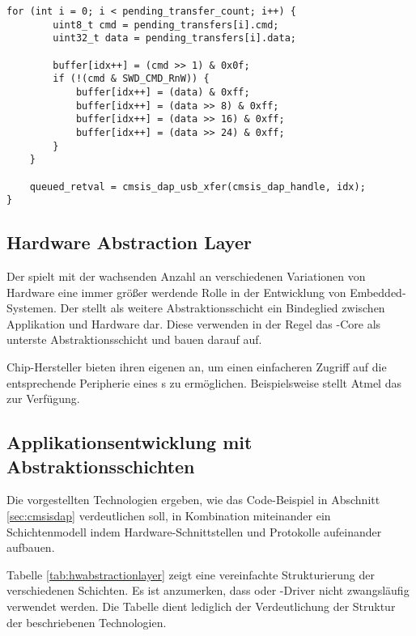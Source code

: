 \begin{enumerate}
\begin{itemize}
\begin{lstlisting}[caption={OpenOCD, \texttt{cmsis\_dap\_usb.c}}, label=cmsisqueue]
    for (int i = 0; i < pending_transfer_count; i++) {
        uint8_t cmd = pending_transfers[i].cmd;
        uint32_t data = pending_transfers[i].data;

        buffer[idx++] = (cmd >> 1) & 0x0f;
        if (!(cmd & SWD_CMD_RnW)) {
        	buffer[idx++] = (data) & 0xff;
        	buffer[idx++] = (data >> 8) & 0xff;
        	buffer[idx++] = (data >> 16) & 0xff;
        	buffer[idx++] = (data >> 24) & 0xff;
        }
    }

    queued_retval = cmsis_dap_usb_xfer(cmsis_dap_handle, idx);
}
    \end{lstlisting}
    \end{itemize}
    \end{enumerate}

    \subsection{Hardware Abstraction Layer}
    Der  spielt mit der wachsenden Anzahl an verschiedenen Variationen von Hardware
    eine immer größer werdende Rolle in der Entwicklung von Embedded-Systemen. Der  stellt als weitere
    Abstraktionsschicht ein Bindeglied zwischen Applikation und Hardware dar. Diese verwenden in der Regel das
    -Core als unterste Abstraktionsschicht und bauen darauf auf.

    Chip-Hersteller bieten ihren eigenen  an, um einen einfacheren Zugriff auf die
    entsprechende Peripherie eines s zu ermöglichen. Beispielsweise stellt Atmel das
     zur Verfügung.

    \subsection{Applikationsentwicklung mit Abstraktionsschichten}
    \label{sec:abstractionoverview}
    Die vorgestellten Technologien ergeben, wie das Code-Beispiel in Abschnitt \ref{sec:cmsisdap} verdeutlichen soll,
    in Kombination miteinander ein Schichtenmodell indem Hardware-Schnittstellen und Protokolle aufeinander aufbauen.

    Tabelle \ref{tab:hwabstractionlayer} zeigt eine vereinfachte Strukturierung der verschiedenen Schichten. Es ist
    anzumerken, dass  oder -Driver nicht zwangsläufig verwendet werden. Die Tabelle dient lediglich der
    Verdeutlichung der Struktur der beschriebenen Technologien.

